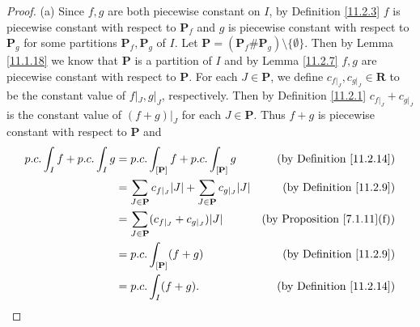 \begin{proof}{(a)}
    Since \(f, g\) are both piecewise constant on \(I\), by Definition \ref{11.2.3} \(f\) is piecewise constant with respect to \(\mathbf{P}_f\) and \(g\) is piecewise constant with respect to \(\mathbf{P}_g\) for some partitions \(\mathbf{P}_f, \mathbf{P}_g\) of \(I\).
    Let \(\mathbf{P} = (\mathbf{P}_f \# \mathbf{P}_g) \setminus \{\emptyset\}\).
    Then by Lemma \ref{11.1.18} we know that \(\mathbf{P}\) is a partition of \(I\) and by Lemma \ref{11.2.7} \(f, g\) are piecewise constant with respect to \(\mathbf{P}\).
    For each \(J \in \mathbf{P}\), we define \(c_{f|_J}, c_{g|_J} \in \mathbf{R}\) to be the constant value of \(f|_J, g|_J\), respectively.
    Then by Definition \ref{11.2.1} \(c_{f|_J} + c_{g|_J}\) is the constant value of \((f + g)|_J\) for each \(J \in \mathbf{P}\).
    Thus \(f + g\) is piecewise constant with respect to \(\mathbf{P}\) and
    \begin{align*}
        p.c. \int_I f + p.c. \int_I g & = p.c. \int_{[\mathbf{P}]} f + p.c. \int_{[\mathbf{P}]} g                               & \text{(by Definition \ref{11.2.14})}    \\
                                      & = \sum_{J \in \mathbf{P}} c_{f|_J} \abs*{J} + \sum_{J \in \mathbf{P}} c_{g|_J} \abs*{J} & \text{(by Definition \ref{11.2.9})}     \\
                                      & = \sum_{J \in \mathbf{P}} (c_{f|_J} + c_{g|_J}) \abs*{J}                                & \text{(by Proposition \ref{7.1.11}(f))} \\
                                      & = p.c. \int_{[\mathbf{P}]} (f + g)                                                      & \text{(by Definition \ref{11.2.9})}     \\
                                      & = p.c. \int_I (f + g).                                                                  & \text{(by Definition \ref{11.2.14})}
    \end{align*}
\end{proof}

